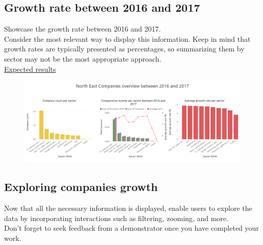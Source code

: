 \documentclass[11pt]{article}
\begin{document}
\subsection{Growth rate between 2016 and 2017}

Showcase the growth rate between 2016 and 2017.\\

Consider the most relevant way to display this information. Keep in mind that growth rates are typically presented as percentages, so summarizing them by sector may not be the most appropriate approach.\\

\underline{Expected results}

\begin{figure}[h!]
    \centering
    \includegraphics[width=\linewidth]{img/p2_outcome1.png}
\end{figure}

\subsection{Exploring companies growth}

Now that all the necessary information is displayed, enable users to explore the data by incorporating interactions such as filtering, zooming, and more.\\

Don't forget to seek feedback from a demonstrator once you have completed your work.
\end{document}
